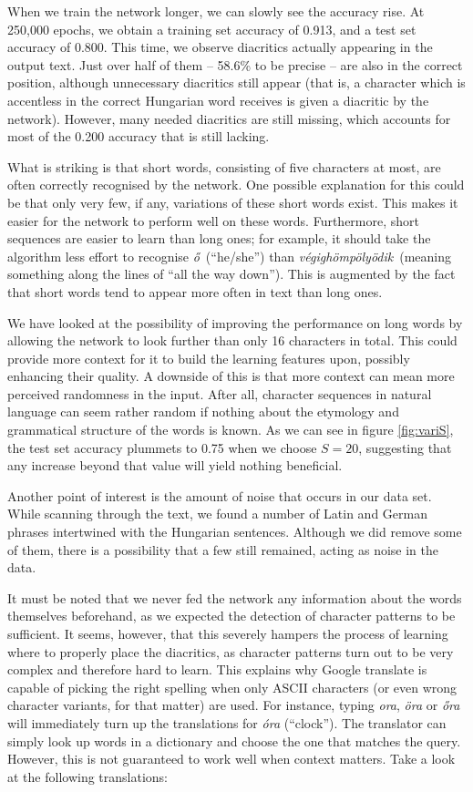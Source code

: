\documentclass[11pt]{article}
\def\tvs{\textvisiblespace}
\begin{document}
When we train the network longer, we can slowly see the accuracy rise. At 250,000 epochs, we obtain a training set accuracy of 0.913, and a test set accuracy of 0.800. This time, we observe diacritics actually appearing in the output text. Just over half of them -- 58.6\% to be precise -- are also in the correct position, although unnecessary diacritics still appear (that is, a character which is accentless in the correct Hungarian word receives is given a diacritic by the network). However, many needed diacritics are still missing, which accounts for most of the 0.200 accuracy that is still lacking.\par
What is striking is that short words, consisting of five characters at most, are often correctly recognised by the network. One possible explanation for this could be that only very few, if any, variations of these short words exist. This makes it easier for the network to perform well on these words. Furthermore, short sequences are easier to learn than long ones; for example, it should take the algorithm less effort to recognise \tvs\textit{ő}\tvs~(``he/she'') than \tvs\textit{végighömpölyödik}\tvs~(meaning something along the lines of ``all the way down''). This is augmented by the fact that short words tend to appear more often in text than long ones.\par
We have looked at the possibility of improving the performance on long words by allowing the network to look further than only 16 characters in total. This could provide more context for it to build the learning features upon, possibly enhancing their quality. A downside of this is that more context can mean more perceived randomness in the input. After all, character sequences in natural language can seem rather random if nothing about the etymology and grammatical structure of the words is known. As we can see in figure \ref{fig:variS}, the test set accuracy plummets to 0.75 when we choose $S=20$, suggesting that any increase beyond that value will yield nothing beneficial.\par
Another point of interest is the amount of noise that occurs in our data set. While scanning through the text, we found a number of Latin and German phrases intertwined with the Hungarian sentences. Although we did remove some of them, there is a possibility that a few still remained, acting as noise in the data.\par
It must be noted that we never fed the network any information about the words themselves beforehand, as we expected the detection of character patterns to be sufficient. It seems, however, that this severely hampers the process of learning where to properly place the diacritics, as character patterns turn out to be very complex and therefore hard to learn. This explains why Google translate is capable of picking the right spelling when only ASCII characters (or even wrong character variants, for that matter) are used. For instance, typing \textit{ora}, \textit{öra} or \textit{őra} will immediately turn up the translations for \textit{óra} (``clock''). The translator can simply look up words in a dictionary and choose the one that matches the query. However, this is not guaranteed to work well when context matters. Take a look at the following translations:\\[2mm]
\end{document}
